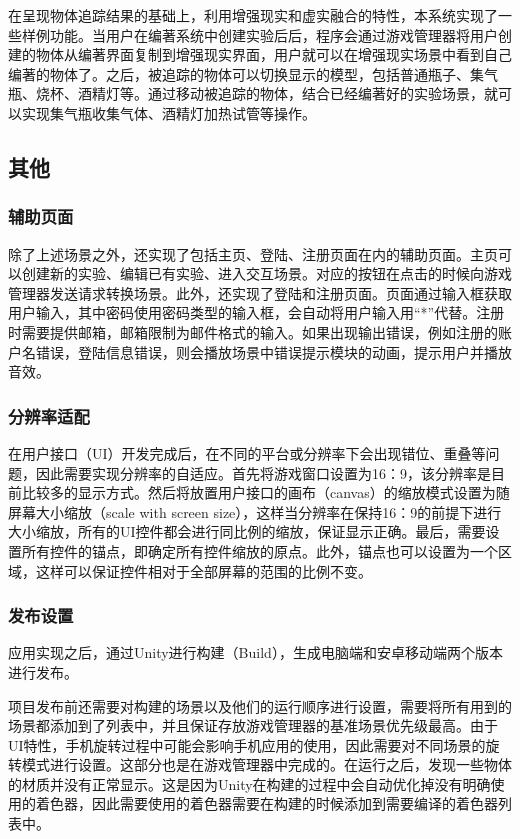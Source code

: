 在呈现物体追踪结果的基础上，利用增强现实和虚实融合的特性，本系统实现了一些样例功能。当用户在编著系统中创建实验后后，程序会通过游戏管理器将用户创建的物体从编著界面复制到增强现实界面，用户就可以在增强现实场景中看到自己编著的物体了。之后，被追踪的物体可以切换显示的模型，包括普通瓶子、集气瓶、烧杯、酒精灯等。通过移动被追踪的物体，结合已经编著好的实验场景，就可以实现集气瓶收集气体、酒精灯加热试管等操作。

\subsection{其他}
\subsubsection{辅助页面}
    除了上述场景之外，还实现了包括主页、登陆、注册页面在内的辅助页面。主页可以创建新的实验、编辑已有实验、进入交互场景。对应的按钮在点击的时候向游戏管理器发送请求转换场景。此外，还实现了登陆和注册页面。页面通过输入框获取用户输入，其中密码使用密码类型的输入框，会自动将用户输入用“*”代替。注册时需要提供邮箱，邮箱限制为邮件格式的输入。如果出现输出错误，例如注册的账户名错误，登陆信息错误，则会播放场景中错误提示模块的动画，提示用户并播放音效。
    
    
\subsubsection{分辨率适配}

    在用户接口（UI）开发完成后，在不同的平台或分辨率下会出现错位、重叠等问题，因此需要实现分辨率的自适应。首先将游戏窗口设置为16：9，该分辨率是目前比较多的显示方式。然后将放置用户接口的画布（canvas）的缩放模式设置为随屏幕大小缩放（scale with screen size），这样当分辨率在保持16：9的前提下进行大小缩放，所有的UI控件都会进行同比例的缩放，保证显示正确。最后，需要设置所有控件的锚点，即确定所有控件缩放的原点。此外，锚点也可以设置为一个区域，这样可以保证控件相对于全部屏幕的范围的比例不变。
    
\subsubsection{发布设置}

        应用实现之后，通过Unity进行构建（Build），生成电脑端和安卓移动端两个版本进行发布。
        
        项目发布前还需要对构建的场景以及他们的运行顺序进行设置，需要将所有用到的场景都添加到了列表中，并且保证存放游戏管理器的基准场景优先级最高。由于UI特性，手机旋转过程中可能会影响手机应用的使用，因此需要对不同场景的旋转模式进行设置。这部分也是在游戏管理器中完成的。在运行之后，发现一些物体的材质并没有正常显示。这是因为Unity在构建的过程中会自动优化掉没有明确使用的着色器，因此需要使用的着色器需要在构建的时候添加到需要编译的着色器列表中。
    
